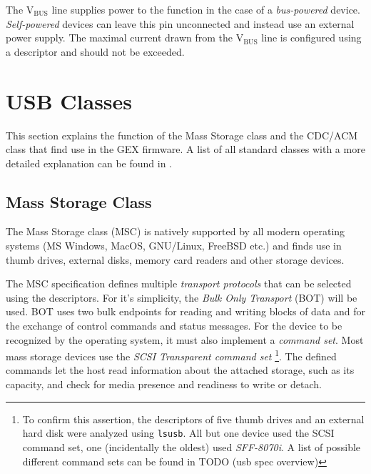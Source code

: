 The V$_\mathrm{BUS}$ line supplies power to the function in the case of a \textit{bus-powered} device. \textit{Self-powered} devices can leave this pin unconnected and instead use an external power supply. The maximal current drawn from the V$_\mathrm{BUS}$ line is configured using a descriptor and should not be exceeded.

\section{USB Classes}

This section explains the function of the Mass Storage class and the CDC/ACM class that find use in the GEX firmware. A list of all standard classes with a more detailed explanation can be found in .

\subsection{Mass Storage Class}

The Mass Storage class (MSC) is natively supported by all modern operating systems (MS Windows, MacOS, GNU/Linux, FreeBSD etc.) and finds use in thumb drives, external disks, memory card readers and other storage devices. 

The MSC specification defines multiple \textit{transport protocols} that can be selected using the descriptors. For it's simplicity, the \textit{Bulk Only Transport} (BOT) will be used. BOT uses two bulk endpoints for reading and writing blocks of data and for the exchange of control commands and status messages. For the device to be recognized by the operating system, it must also implement a \textit{command set}. Most mass storage devices use the \textit{SCSI Transparent command set} 
\footnote{To confirm this assertion, the descriptors of five thumb drives and an external hard disk were analyzed using \verb|lsusb|. All but one device used the SCSI command set, one (incidentally the oldest) used \textit{SFF-8070i}. A list of possible different command sets can be found in TODO (usb spec overview)}.
The defined commands let the host read information about the attached storage, such as its capacity, and check for media presence and readiness to write or detach.



